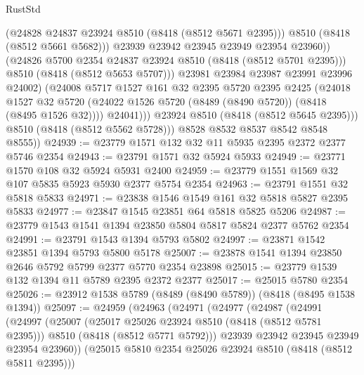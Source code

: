 \begin{lexlean}{RustStd}
\begin{coremodule}
                          (@24828 @24837 @23924 @8510 (@8418 (@8512 @5671 @2395)))
                          @8510
                          (@8418 (@8512 @5661 @5682)))
                        @23939
                        @23942
                        @23945
                        @23949
                        @23954
                        @23960))
                    (@24826 @5700 @2354 @24837 @23924 @8510 (@8418 (@8512 @5701 @2395)))
                    @8510
                    (@8418 (@8512 @5653 @5707)))
                  @23981
                  @23984
                  @23987
                  @23991
                  @23996
                  @24002)
                (@24008
                  @5717
                  @1527
                  @161
                  @32
                  @2395
                  @5720
                  @2395
                  @2425
                  (@24018
                    @1527
                    @32
                    @5720
                    (@24022 @1526 @5720 (@8489 (@8490 @5720)) (@8418 (@8495 @1526 @32))))
                  @24041)))
            @23924
            @8510
            (@8418 (@8512 @5645 @2395)))
          @8510
          (@8418 (@8512 @5562 @5728)))
        @8528
        @8532
        @8537
        @8542
        @8548
        @8555))
@24939 := @23779 @1571 @132 @32 @11 @5935 @2395 @2372 @2377 @5746 @2354
@24943 := @23791 @1571 @32 @5924 @5933
@24949 := @23771 @1570 @108 @32 @5924 @5931 @2400
@24959 := @23779 @1551 @1569 @32 @107 @5835 @5923 @5930 @2377 @5754 @2354
@24963 := @23791 @1551 @32 @5818 @5833
@24971 := @23838 @1546 @1549 @161 @32 @5818 @5827 @2395 @5833
@24977 := @23847 @1545 @23851 @64 @5818 @5825 @5206
@24987 := @23779 @1543 @1541 @1394 @23850 @5804 @5817 @5824 @2377 @5762 @2354
@24991 := @23791 @1543 @1394 @5793 @5802
@24997 := @23871 @1542 @23851 @1394 @5793 @5800 @5178
@25007 := @23878 @1541 @1394 @23850 @2646 @5792 @5799 @2377 @5770 @2354 @23898
@25015 := @23779 @1539 @132 @1394 @11 @5789 @2395 @2372 @2377
@25017 := @25015 @5780 @2354
@25026 := @23912 @1538 @5789 (@8489 (@8490 @5789)) (@8418 (@8495 @1538 @1394))
@25097 := @24959
    (@24963
      (@24971
        (@24977
          (@24987
            (@24991
              (@24997
                (@25007
                  (@25017 @25026 @23924 @8510 (@8418 (@8512 @5781 @2395)))
                  @8510
                  (@8418 (@8512 @5771 @5792)))
                @23939
                @23942
                @23945
                @23949
                @23954
                @23960))
            (@25015 @5810 @2354 @25026 @23924 @8510 (@8418 (@8512 @5811 @2395)))

\end{coremodule}
\end{lexlean}
